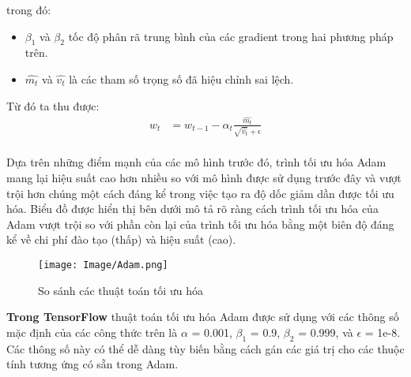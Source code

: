 trong đó:

\begin{itemize}
\item $\beta_1$ và $\beta_2$ tốc độ phân rã trung bình của các gradient trong hai phương pháp trên.
\item $\hat{m_t}$ và $\hat{v_t}$ là các tham số trọng số đã hiệu chỉnh sai lệch.
\end {itemize} 
Từ đó ta thu được:
\begin{equation}
    \begin{aligned}  
    w_t & = w_{t-1} - \alpha_t \frac{\hat{m_t}}{\sqrt{\hat{v_t}} + \epsilon}\\
\end{aligned}
\end{equation}

Dựa trên những điểm mạnh của các mô hình trước đó, trình tối ưu hóa Adam mang lại hiệu suất cao hơn nhiều so với mô hình được sử dụng trước đây và vượt trội hơn
chúng một cách đáng kể trong việc tạo ra độ dốc giảm dần được tối ưu hóa. Biểu đồ được hiển thị bên dưới mô tả rõ ràng cách trình tối ưu hóa của Adam vượt trội 
so với phần còn lại của trình tối ưu hóa bằng một biên độ đáng kể về chi phí đào tạo (thấp) và hiệu suất (cao). 

\begin{figure}[h!]
    \centering
    \texttt{[image: Image/Adam.png]}
    \caption{So sánh các thuật toán tối ưu hóa}
    \label{Hình 1.1: Graph Neural Network}
    \cite*{WEBSITE:3}
\end{figure}


\textbf{Trong TensorFlow} thuật toán tối ưu hóa Adam được sử dụng với các thông số mặc định của các công thức trên là $\alpha$ = 0.001, $\beta_1$ = 0.9, $\beta_2$ = 0.999, và $\epsilon$ = 1e-8. 
Các thông số này có thể dễ dàng tùy biến bằng cách gán các giá trị cho các thuộc tính tương ứng có sẵn trong Adam.

